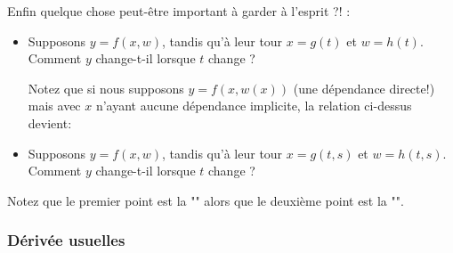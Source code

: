 	Enfin quelque chose peut-être important à garder à l'esprit ?! :
	\begin{itemize}
		\item Supposons $y=f(x,w)$, tandis qu'à leur tour $x=g(t)$ et $w=h(t)$. Comment $y$ change-t-il lorsque $t$ change ?
		
		Notez que si nous supposons $y=f(x,w(x))$ (une dépendance directe!) mais avec $x$ n'ayant aucune dépendance implicite, la relation ci-dessus devient\label{tota differential with direct dependency}:
		
		
		\item Supposons $y=f(x,w)$, tandis qu'à leur tour $x=g(t,s)$ et $w=h(t,s)$. Comment $y$ change-t-il lorsque $t$ change ?
		
	\end{itemize}
	Notez que le premier point est la "" alors que le deuxième point est la "".
	 
	 \subsubsection{Dérivée usuelles}\label{usual derivatives}
	 
